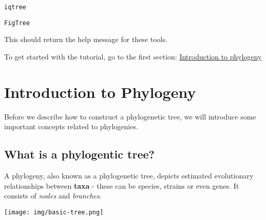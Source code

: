\documentclass[11pt]{article}
\makeatletter
\newcommand{\boxspacing}{\kern\kvtcb@left@rule\kern\kvtcb@boxsep}
\newcommand{\prompt}[4]{
        {\ttfamily\llap{{\color{#2}[#3]:\hspace{3pt}#4}}\vspace{-\baselineskip}}
    }
\makeatother
\begin{document}
    \begin{tcolorbox}[breakable, size=fbox, boxrule=1pt, pad at break*=1mm,colback=cellbackground, colframe=cellborder]
\prompt{In}{incolor}{ }{\boxspacing}
\begin{Verbatim}[commandchars=\\\{\}]
iqtree
\end{Verbatim}
\end{tcolorbox}

    \begin{tcolorbox}[breakable, size=fbox, boxrule=1pt, pad at break*=1mm,colback=cellbackground, colframe=cellborder]
\prompt{In}{incolor}{ }{\boxspacing}
\begin{Verbatim}[commandchars=\\\{\}]
FigTree
\end{Verbatim}
\end{tcolorbox}

    This should return the help message for these tools.

To get started with the tutorial, go to the first section:
\href{intro_to_phylogeny.ipynb}{Introduction to phylogeny}





\newpage





    \hypertarget{introduction-to-phylogeny}{%
\section{Introduction to Phylogeny}\label{introduction-to-phylogeny}}

Before we describe how to construct a phylogenetic tree, we will
introduce some important concepts related to phylogenies.

    \hypertarget{what-is-a-phylogentic-tree}{%
\subsection{What is a phylogentic
tree?}\label{what-is-a-phylogentic-tree}}

A phylogeny, also known as a phylogenetic tree, depicts estimated
evolutionary relationships between \textbf{taxa} - these can be species,
strains or even genes. It consists of \textit{nodes} and \textit{branches}.


\begin{center}
\texttt{[image: img/basic-tree.png]}
\end{center}
\end{document}
